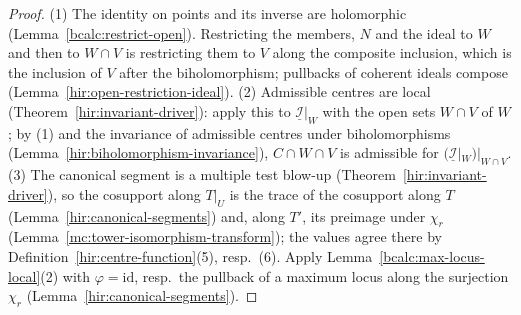 \begin{proof}
\mixedleanok
(1) The identity on points and its inverse are holomorphic (Lemma~\ref{bcalc:restrict-open}). Restricting the members, \(N\) and the ideal to \(W\) and then
to \(W\cap V\) is restricting them to \(V\) along the composite inclusion, which is the inclusion of \(V\) after the biholomorphism; pullbacks of coherent
ideals compose (Lemma~\ref{hir:open-restriction-ideal}). (2) Admissible centres are local (Theorem~\ref{hir:invariant-driver}): apply this to
\(\underline{\mathcal I}|_W\) with the open sets \(W\cap V\) of \(W\); by (1) and the invariance of admissible centres under biholomorphisms
(Lemma~\ref{hir:biholomorphism-invariance}), \(C\cap W\cap V\) is admissible for \((\underline{\mathcal I}|_W)|_{W\cap V}\). (3) The canonical segment is a multiple test
blow-up (Theorem~\ref{hir:invariant-driver}), so the cosupport along \(T|_U\) is the trace of the cosupport along \(T\) (Lemma~\ref{hir:canonical-segments}) and,
along \(T'\), its preimage under \(\chi_r\) (Lemma~\ref{mc:tower-isomorphism-transform}); the values agree there by Definition~\ref{hir:centre-function}(5),
resp.\ (6). Apply Lemma~\ref{bcalc:max-locus-local}(2) with \(\varphi=\mathrm{id}\), resp.\ the pullback of a maximum locus along the surjection \(\chi_r\)
(Lemma~\ref{hir:canonical-segments}).
\end{proof}

